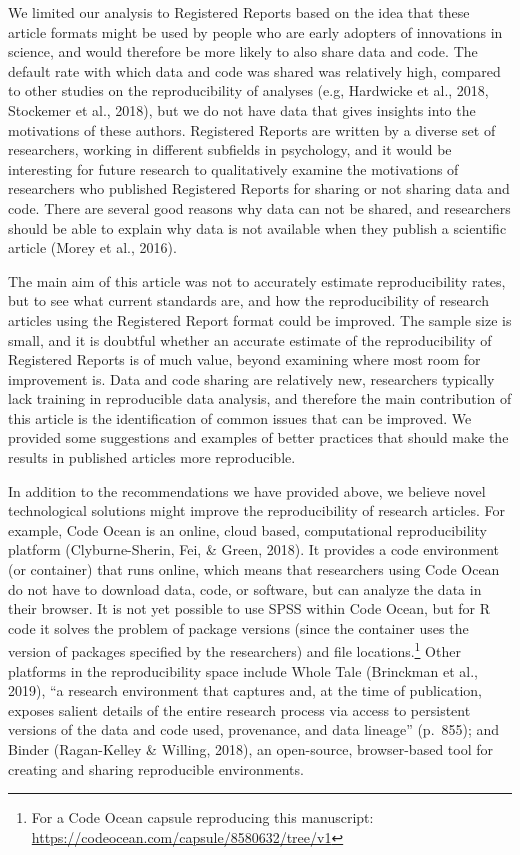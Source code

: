 \documentclass[,jou, a4paper,floatsintext]{apa6}
\let\rmarkdownfootnote\footnote%
\def\footnote{\protect\rmarkdownfootnote}
\begin{document}
We limited our analysis to Registered Reports based on the idea that these article formats might be used by people who are early adopters of innovations in science, and would therefore be more likely to also share data and code. The default rate with which data and code was shared was relatively high, compared to other studies on the reproducibility of analyses (e.g, Hardwicke et al., 2018, Stockemer et al., 2018), but we do not have data that gives insights into the motivations of these authors. Registered Reports are written by a diverse set of researchers, working in different subfields in psychology, and it would be interesting for future research to qualitatively examine the motivations of researchers who published Registered Reports for sharing or not sharing data and code. There are several good reasons why data can not be shared, and researchers should be able to explain why data is not available when they publish a scientific article (Morey et al., 2016).

The main aim of this article was not to accurately estimate reproducibility rates, but to see what current standards are, and how the reproducibility of research articles using the Registered Report format could be improved. The sample size is small, and it is doubtful whether an accurate estimate of the reproducibility of Registered Reports is of much value, beyond examining where most room for improvement is. Data and code sharing are relatively new, researchers typically lack training in reproducible data analysis, and therefore the main contribution of this article is the identification of common issues that can be improved. We provided some suggestions and examples of better practices that should make the results in published articles more reproducible.

In addition to the recommendations we have provided above, we believe novel technological solutions might improve the reproducibility of research articles. For example, Code Ocean is an online, cloud based, computational reproducibility platform (Clyburne-Sherin, Fei, \& Green, 2018). It provides a code environment (or container) that runs online, which means that researchers using Code Ocean do not have to download data, code, or software, but can analyze the data in their browser. It is not yet possible to use SPSS within Code Ocean, but for R code it solves the problem of package versions (since the container uses the version of packages specified by the researchers) and file locations.\footnote{For a Code Ocean capsule reproducing this manuscript: \url{https://codeocean.com/capsule/8580632/tree/v1}} Other platforms in the reproducibility space include Whole Tale (Brinckman et al., 2019), \enquote{a research environment that captures and, at the time of publication, exposes salient details of the entire research process via access to persistent versions of the data and code used, provenance, and data lineage} (p.~855); and Binder (Ragan-Kelley \& Willing, 2018), an open-source, browser-based tool for creating and sharing reproducible environments.
\end{document}
